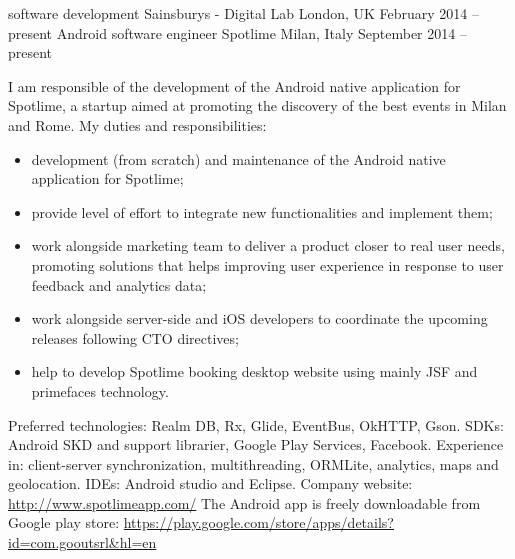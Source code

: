 \begin{cventries}
\cventry
{software development}
{Sainsburys - Digital Lab}
{London, UK}
{February 2014 -- present}
{%
}
\cventry
{Android software engineer}
{Spotlime}
{Milan, Italy}
{September 2014 -- present}
{
   I am responsible of the 
   development of the 
   Android native application for 
   Spotlime, a startup aimed  at promoting  the 
   discovery of the best events in Milan and Rome. 
   My duties and responsibilities:
   \begin{itemize}
      \item development (from scratch) and maintenance of the Android native application
	 for Spotlime;
      \item provide level of effort to integrate new functionalities and
	 implement them;
      \item 
   work alongside marketing team to deliver a product closer
   to real user
   needs, promoting solutions that helps improving user experience in response
   to user feedback and analytics data;
      \item 
   work alongside server-side and iOS developers to coordinate the upcoming
   releases following CTO directives;
\item help to develop Spotlime booking desktop website using mainly JSF and
   primefaces technology.
\end{itemize}
Preferred technologies: Realm DB, Rx, Glide, EventBus, OkHTTP,
Gson.
SDKs: Android SKD and support librarier, Google Play Services, Facebook.
   Experience in: client-server synchronization,  multithreading, 
   ORMLite,  
   analytics, maps and geolocation. 
IDEs: Android studio and Eclipse. 
   Company website:
   \url{http://www.spotlimeapp.com/}
   The Android app is freely downloadable from Google play store: 
   \url{https://play.google.com/store/apps/details?id=com.gooutsrl&hl=en}
}


\end{cventries}
